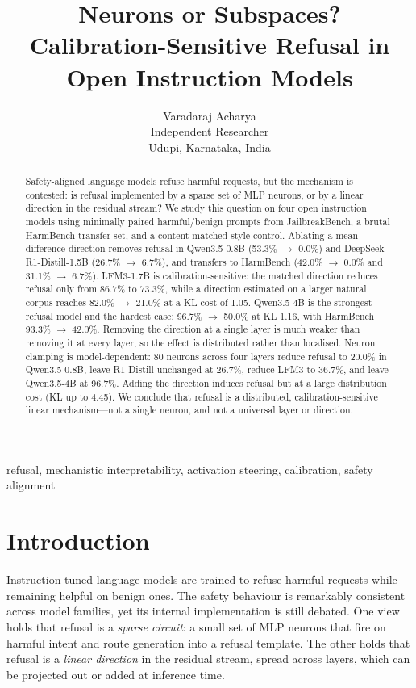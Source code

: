 \documentclass[twoside,11pt]{article}
\title{Neurons or Subspaces?\\[2pt]
Calibration-Sensitive Refusal in Open Instruction Models}
\author{\name Varadaraj Acharya \email{varadaraj277@gmail.com} \\
        \addr Independent Researcher\\
        Udupi, Karnataka, India}
\begin{document}
\maketitle

\begin{abstract}
Safety-aligned language models refuse harmful requests, but the mechanism is
contested: is refusal implemented by a sparse set of MLP neurons, or by a linear
direction in the residual stream? We study this question on four open instruction
models using minimally paired harmful/benign prompts from JailbreakBench, a brutal
HarmBench transfer set, and a content-matched style control. Ablating a
mean-difference direction removes refusal in Qwen3.5-0.8B (53.3\% $\to$ 0.0\%) and
DeepSeek-R1-Distill-1.5B (26.7\% $\to$ 6.7\%), and transfers to HarmBench
(42.0\% $\to$ 0.0\% and 31.1\% $\to$ 6.7\%). LFM3-1.7B is calibration-sensitive:
the matched direction reduces refusal only from 86.7\% to 73.3\%, while a direction
estimated on a larger natural corpus reaches 82.0\% $\to$ 21.0\% at a KL cost of
1.05. Qwen3.5-4B is the strongest refusal model and the hardest case:
96.7\% $\to$ 50.0\% at KL 1.16, with HarmBench 93.3\% $\to$ 42.0\%. Removing the
direction at a single layer is much weaker than removing it at every layer, so the
effect is distributed rather than localised. Neuron clamping is
model-dependent: 80 neurons across four layers reduce refusal to 20.0\% in
Qwen3.5-0.8B, leave R1-Distill unchanged at 26.7\%, reduce LFM3 to 36.7\%, and
leave Qwen3.5-4B at 96.7\%. Adding the direction induces refusal but at a large
distribution cost (KL up to 4.45). We conclude that refusal is a distributed,
calibration-sensitive linear mechanism---not a single neuron, and not a universal
layer or direction.
\end{abstract}

\begin{keywords}
refusal, mechanistic interpretability, activation steering, calibration, safety alignment
\end{keywords}

\section{Introduction}

Instruction-tuned language models are trained to refuse harmful requests while
remaining helpful on benign ones. The safety behaviour is remarkably consistent
across model families, yet its internal implementation is still debated. One view
holds that refusal is a \emph{sparse circuit}: a small set of MLP neurons that fire
on harmful intent and route generation into a refusal template. The other holds
that refusal is a \emph{linear direction} in the residual stream, spread across
layers, which can be projected out or added at inference time.
\end{document}
